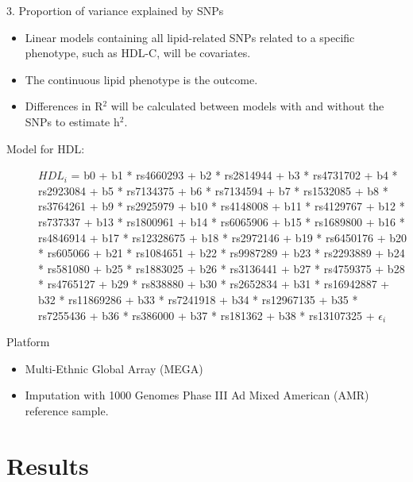 \documentclass[pdf]{beamer}\usepackage[]{graphicx}\usepackage[]{color}
\begin{document}
\begin{frame}{3. Proportion of variance explained by SNPs}

\begin{itemize}
  \item Linear models containing all lipid-related SNPs related to a specific phenotype, such as HDL-C, will be covariates. 
  \item The continuous lipid phenotype is the outcome. 
  \item Differences in R$^2$ will be calculated between models with and without the SNPs to estimate h$^2$.
\end{itemize}

\begin{description}
  \item[Model for HDL:] \scriptsize$HDL_i$ = b0 + b1 * rs4660293 + b2 * rs2814944 + b3 * rs4731702 + b4 * rs2923084 + b5 * rs7134375 + b6 * rs7134594 + b7 * rs1532085 + b8 * rs3764261 + b9 * rs2925979 + b10 * rs4148008 + b11 * rs4129767 + b12 * rs737337 + b13 * rs1800961 + b14 * rs6065906 + b15 * rs1689800 + b16 * rs4846914 + b17 * rs12328675 + b18 * rs2972146 + b19 * rs6450176 + b20 * rs605066 + b21 * rs1084651 + b22 * rs9987289 + b23 * rs2293889 + b24 * rs581080 + b25 * rs1883025 + b26 * rs3136441 + b27 * rs4759375 + b28 * rs4765127 + b29 * rs838880 + b30 * rs2652834 + b31 * rs16942887 + b32 * rs11869286 + b33 * rs7241918 + b34 * rs12967135 + b35 * rs7255436 + b36 * rs386000 + b37 * rs181362 + b38 * rs13107325 + $\epsilon_i$
\end{description}


\end{frame}

\begin{frame}{Platform}

\begin{itemize}
  \item Multi-Ethnic Global Array (MEGA)
  \item Imputation with 1000 Genomes Phase III Ad Mixed American (AMR) reference sample.
  \end{itemize}
\end{frame}


\section{Results}
\end{document}
